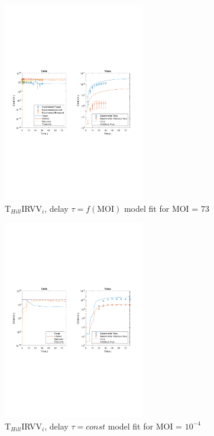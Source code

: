 \begin{figure}[H]
\begin{center}
\includegraphics[width=0.55\textwidth, trim={1cm 9.5cm 1cm 9.5cm}, clip]{D_chapters/6_appendix/4_THillIRVViDelay/ModelTHillIRVViDelayDSNSaenz2010FittedMOI73B0.0010133D0.55548P3247.2256C0.0027335TIC1896440.1965TH4.9813iFrac0.11736log.pdf}
\caption[T$_{Hill}$IRVV$_i$, delay $\tau = f(\text{MOI})$ model fit for MOI = 73]%
{T$_{Hill}$IRVV$_i$, delay $\tau = f(\text{MOI})$ model fit for MOI = 73}
\label{figure:THillIRVViDelayMOI73}
\end{center}
\end{figure}

\newpage

\begin{figure}[H]
\begin{center}
\includegraphics[width=0.55\textwidth, trim={1cm 9.5cm 1cm 9.5cm}, clip]{D_chapters/6_appendix/4_THillIRVViDelayFitTau/ModelTHillIRVViDelayFitTauDSNFittedMOI0.0001B0.000659D0.55529P5629.8721C0.066804TIC2576955.7218TH4.025T0.2iFrac0.025402log.pdf}
\caption[T$_{Hill}$IRVV$_i$, delay $\tau = const$ model fit for MOI = $10^{-4}$]%
{T$_{Hill}$IRVV$_i$, delay $\tau = const$ model fit for MOI = $10^{-4}$}
\label{figure:THillIRVViDelayFitTauMOI00001}
\end{center}
\end{figure}

